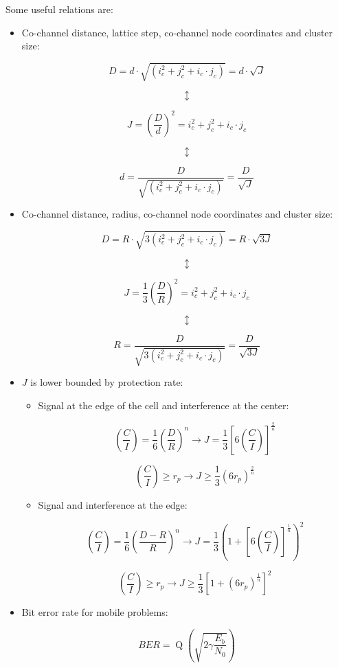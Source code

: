 \documentclass[../main.tex]{subfiles}
\begin{document}
Some useful relations are:
\begin{itemize}
	\item {
		Co-channel distance, lattice step, co-channel node coordinates and cluster size:

		$$
			D = d \cdot \sqrt{(i_{c}^2 + j_{c}^2 + i_{c} \cdot j_{c})} = d \cdot \sqrt{J}
		$$

		$$\updownarrow$$

		$$
			J = \left( \frac {D} {d} \right)^2 = i_{c}^2 + j_{c}^2 + i_{c} \cdot j_{c}
		$$

		$$\updownarrow$$

		$$
			d = \frac {D} {\sqrt{(i_{c}^2 + j_{c}^2 + i_{c} \cdot j_{c})}} = \frac{D}{\sqrt{J}}
		$$
	}
	\item {
		Co-channel distance, radius, co-channel node coordinates and cluster size:

		$$
			D = R \cdot \sqrt{3 (i_{c}^2 + j_{c}^2 + i_{c} \cdot j_{c})} = R \cdot \sqrt{3 J}
		$$

		$$\updownarrow$$

		$$
			J = \frac{1}{3} \left( \frac{D}{R} \right)^2 = i_{c}^2 + j_{c}^2 + i_{c} \cdot j_{c}
		$$

		$$\updownarrow$$

		$$
			R = \frac {D} {\sqrt{3 (i_{c}^2 + j_{c}^2 + i_{c} \cdot j_{c})}} = \frac{D}{\sqrt{3 J}}
		$$
	}
	\item {
		$J$ is lower bounded by protection rate:
		\begin{itemize}
			\item {
				Signal at the edge of the cell and interference at the center:

				$$
					\left( \frac{C}{I} \right) = \frac {1} {6} \left( \frac {D} {R} \right)^n \rightarrow
					J = \frac {1} {3} \left[ 6 \left( \frac{C}{I} \right) \right]^{\frac {2} {n}}
				$$

				$$
					\left( \frac{C}{I} \right) \geq r_p \rightarrow
					J \geq \frac {1} {3} \left( 6 r_p \right)^{\frac{2}{n}}
				$$
			}
			\item {
				Signal and interference at the edge:

				$$
					\left( \frac{C}{I} \right) = \frac {1} {6} \left( \frac {D - R} {R} \right)^n \rightarrow
					J = \frac {1} {3} \left( 1 + \left[ 6 \left( \frac{C}{I} \right) \right]^{\frac {1} {n}} \right)^2
				$$

				$$
					\left( \frac{C}{I} \right) \geq r_p \rightarrow
					J \geq \frac {1} {3} \left[ 1 + \left( 6 r_p \right)^{\frac{1}{n}} \right]^2
				$$
			}
		\end{itemize}
	}
	\item {
		Bit error rate for mobile problems:

		$$
			BER = \operatorname{Q} \left( \sqrt{2 \gamma \frac{E_b}{N_0}} \right)
		$$
	}
\end{itemize}
\end{document}
